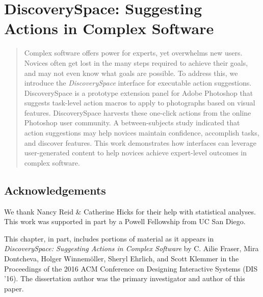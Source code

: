 \chapter{DiscoverySpace: Suggesting Actions in Complex Software}
\label{chapter:discoveryspace}
\begin{quote}
Complex software offers power for experts, yet overwhelms new users. Novices often get lost in the many steps required to achieve their goals, and may not even know what goals are possible. To address this, we introduce the \textit{Discovery\-Space} interface for executable action suggestions. Discovery\-Space is a prototype extension panel for Adobe Photoshop that suggests task-level action macros to apply to photographs based on visual features. Discovery\-Space harvests these one-click actions from the online Photoshop user community. A between-subjects study indicated that action suggestions may help novices maintain confidence, accomplish tasks, and discover features. This work demonstrates how interfaces can leverage user-generated content to help novices achieve expert-level outcomes in complex software.
\end{quote}











\section{Acknowledgements}
We thank Nancy Reid \& Catherine Hicks for their help with statistical analyses. This work was supported in part by a Powell Fellowship from UC San Diego.

This chapter, in part, includes portions of material as it appears in \textit{DiscoverySpace: Suggesting Actions in Complex Software} by C. Ailie Fraser, Mira Dontcheva, Holger Winnemöller, Sheryl Ehrlich, and Scott Klemmer in the Proceedings of the 2016 ACM Conference on Designing Interactive Systems (DIS '16). The dissertation author was the primary investigator and author of this paper.